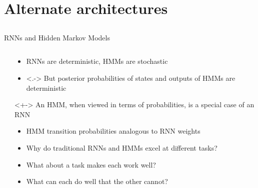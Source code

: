 \section{Alternate architectures}
\subsection{}

\begin{frame}{RNN{}s and Hidden Markov Models}
    \begin{columns}
        \begin{column}{0.46\textwidth}
            
        \end{column}
        \begin{column}{0.54\textwidth}
            \begin{itemize}
                \item<+-> RNN{}s are deterministic, HMM{}s are stochastic
                \item<.-> But posterior probabilities of states and outputs of HMM{}s are deterministic
            \end{itemize}
            \begin{block}{}<+->
                An HMM{}, when viewed in terms of probabilities, is a special case of an RNN{}
            \end{block}
            \begin{itemize}[<.->]
                \item HMM{} transition probabilities analogous to RNN{} weights
                \item<+-> Why do traditional RNN{}s and HMM{}s excel at different tasks?
                \item What about a task makes each work well?
                \item What can each do well that the other cannot?
            \end{itemize}
        \end{column}
    \end{columns}
\end{frame}

